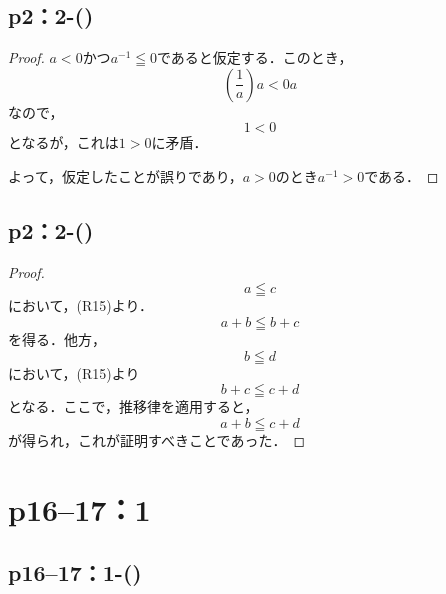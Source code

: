 \documentclass[a4paper,10pt,fleqn]{ltjsarticle}
\begin{document}
\subsection*{p2：2-()}

\begin{leftbar}
    \begin{proof}
        $a<0$かつ$a^{-1} \leqq 0$であると仮定する．このとき，
        \[
            \left( \frac{1}{a} \right) a < 0a
        \]
        なので，
        \[
            1<0
        \]
        となるが，これは$1>0$に矛盾．

        よって，仮定したことが誤りであり，$a>0$のとき$a^{-1} >0$である．
    \end{proof}
\end{leftbar}

\subsection*{p2：2-()}

\begin{leftbar}
    \begin{proof}
        \[
            a \leqq c
        \]
        において，(R15)より．
        \[
            a+b \leqq b+c
        \]
        を得る．他方，
        \[
            b \leqq d
        \]
        において，(R15)より
        \[
            b + c \leqq c+d
        \]
        となる．ここで，推移律を適用すると，
        \[
            a+b \leqq c+d
        \]
        が得られ，これが証明すべきことであった．
    \end{proof}
\end{leftbar}
%
\section*{p16--17：1}

\subsection*{p16--17：1-()}
\end{document}
